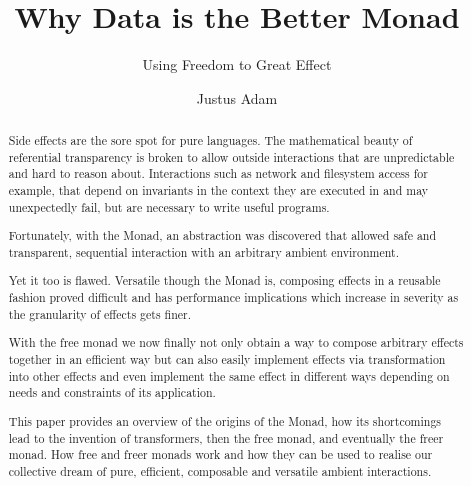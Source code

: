 \documentclass[sigconf]{acmart}
\begin{document}
\title{Why Data is the Better Monad}
\subtitle{Using Freedom to Great Effect}

\author{Justus Adam}
\affiliation{}


\begin{abstract}
Side effects are the sore spot for pure languages. The mathematical beauty of
referential transparency is broken to allow outside interactions that are
unpredictable and hard to reason about. Interactions such as network and
filesystem access for example, that depend on invariants in the context they are
executed in and may unexpectedly fail, but are necessary to write useful
programs.

Fortunately, with the Monad, an abstraction was discovered that allowed safe and
transparent, sequential interaction with an arbitrary ambient environment.

Yet it too is flawed. Versatile though the Monad is, composing effects in a
reusable fashion proved difficult and has performance implications which
increase in severity as the granularity of effects gets finer.

With the free monad we now finally not only obtain a way to compose arbitrary
effects together in an efficient way but can also easily implement effects via
transformation into other effects and even implement the same effect in
different ways depending on needs and constraints of its application.

This paper provides an overview of the origins of the Monad, how its
shortcomings lead to the invention of transformers, then the free monad, and
eventually the freer monad. How free and freer monads work and how they can be
used to realise our collective dream of pure, efficient, composable and
versatile ambient interactions.
\end{abstract}

\maketitle













\end{document}
